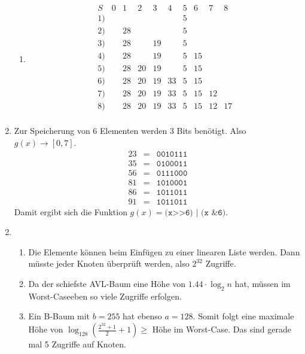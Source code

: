 \documentclass[a4paper,11pt]{article}             %
\begin{document}
\begin{enumerate}
\begin{enumerate}
\item
\begin{equation*}
\begin{array}{c|ccccccccc}
S  &0&1&2&3&4&5&6&7&8\\
\hline
1) & & & & & &5& & & \\
2) & &28& & & &5& & & \\
3) & &28& &19& &5& & & \\
4) & &28& &19& &5&15& & \\
5) & &28&20&19& &5&15& & \\
6) & &28&20&19&33&5&15& & \\
7) & &28&20&19&33&5&15&12& \\
8) & &28&20&19&33&5&15&12&17\\
\end{array}
\end{equation*}
\end{enumerate}

\item
Zur Speicherung von 6 Elementen werden 3 Bits benötigt. Also $g(x) \rightarrow [0,7]$.
\begin{equation*}
\begin{array}{ccc}
23 & = & \texttt{0010111}\\
35 & = & \texttt{0100011}\\
56 & = & \texttt{0111000}\\
81 & = & \texttt{1010001}\\
86 & = & \texttt{1011011}\\
91 & = & \texttt{1011011}
\end{array}
\end{equation*}
Damit ergibt sich die Funktion $g(x) = \texttt{(x>>6) | (x \& 6)}$.
\end{enumerate}

\begin{enumerate}
\setcounter{enumi}{1}
\item 
\begin{enumerate}
\item Die Elemente können beim Einfügen zu einer linearen Liste werden. Dann müsste jeder Knoten überprüft werden, also $2^32$ Zugriffe.
\item Da der schiefste AVL-Baum eine Höhe von $1.44 \cdot \log_2 n$ hat, müssen im Worst-Caseeben so viele Zugriffe erfolgen.
\item Ein B-Baum mit $b=255$ hat ebenso $a=128$. Somit folgt eine maximale Höhe von $\log_{128}\left(\frac{2^{32} + 1}{2}+1  \right)\geq$ Höhe im Worst-Case. Das sind gerade mal 5 Zugriffe auf Knoten.
\end{enumerate}
\end{enumerate}
\end{document}
